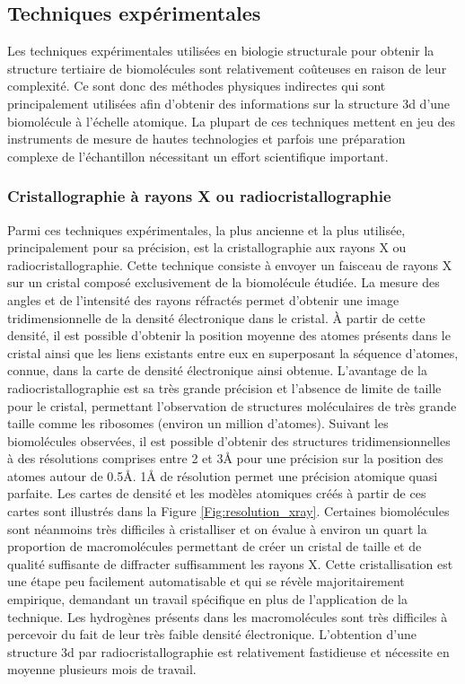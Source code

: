 \subsection{Techniques expérimentales}

Les techniques expérimentales utilisées en biologie structurale pour obtenir la structure tertiaire de biomolécules sont relativement coûteuses en raison de leur complexité. Ce sont donc des méthodes physiques indirectes qui sont principalement utilisées afin d'obtenir des informations sur la structure 3d d'une biomolécule à l'échelle atomique. La plupart de ces techniques mettent en jeu des instruments de mesure de hautes technologies et parfois une préparation complexe de l'échantillon nécessitant un effort scientifique important.

\subsubsection{Cristallographie à rayons X ou radiocristallographie}

Parmi ces techniques expérimentales, la plus ancienne et la plus utilisée, principalement pour sa précision, est la cristallographie aux rayons X ou radiocristallographie. Cette technique consiste à envoyer un faisceau de rayons X sur un cristal composé exclusivement de la biomolécule étudiée. La mesure des angles et de l'intensité des rayons réfractés permet d'obtenir une image tridimensionnelle de la densité électronique dans le cristal. À partir de cette densité, il est possible d'obtenir la position moyenne des atomes présents dans le cristal ainsi que les liens existants entre eux en superposant la séquence d'atomes, connue, dans la carte de densité électronique ainsi obtenue. 
L'avantage de la radiocristallographie est sa très grande précision et l'absence de limite de taille pour le cristal, permettant l'observation de structures moléculaires de très grande taille comme les ribosomes (environ un million d'atomes). Suivant les biomolécules observées, il est possible d'obtenir des structures tridimensionnelles à des résolutions comprises entre 2 et 3\r{A} pour une précision sur la position des atomes autour de 0.5\r{A}. 1\r{A} de résolution permet une précision atomique quasi parfaite. Les cartes de densité et les modèles atomiques créés à partir de ces cartes sont illustrés dans la Figure \ref{Fig:resolution_xray}. 
Certaines biomolécules sont néanmoins très difficiles à cristalliser et on évalue à environ un quart la proportion de macromolécules permettant de créer un cristal de taille et de qualité suffisante de diffracter suffisamment les rayons X. Cette cristallisation est une étape peu facilement automatisable et qui se révèle majoritairement empirique, demandant un travail spécifique en plus de l'application de la technique. Les hydrogènes présents dans les macromolécules sont très difficiles à percevoir du fait de leur très faible densité électronique. L'obtention d'une structure 3d par radiocristallographie est relativement fastidieuse et nécessite en moyenne plusieurs mois de travail.

